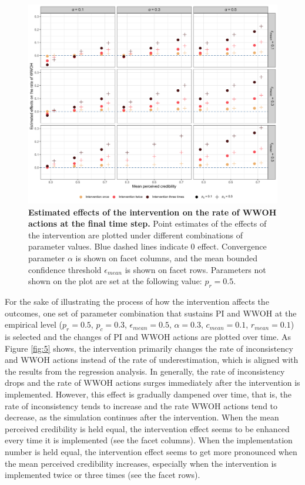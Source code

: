 \documentclass[
  11pt,
]{article}
\begin{document}
\begin{figure}[h]
  \centering
  \includegraphics[width=1\columnwidth]{./figures/intervention_effect_p_wwoh.png}
  \caption{\textbf{Estimated effects of the intervention on the rate of WWOH actions at the final time step.} Point estimates of the effects of the intervention are plotted under different combinations of parameter values. Blue dashed lines indicate 0 effect. Convergence parameter $\alpha$ is shown on facet columns, and the mean bounded confidence threshold $\epsilon_{mean}$ is shown on facet rows. Parameters not shown on the plot are set at the following value: $p_r = 0.5$.}
  \label{fig:4}
\end{figure}

For the sake of illustrating the process of how the intervention affects
the outcomes, one set of parameter combination that sustains PI and WWOH
at the empirical level (\(p_r = 0.5\), \(p_c = 0.3\),
\(\epsilon_{mean} = 0.5\), \(\alpha = 0.3\), \(c_{mean} = 0.1\),
\(r_{mean} = 0.1\)) is selected and the changes of PI and WWOH actions
are plotted over time. As Figure \ref{fig:5} shows, the intervention
primarily changes the rate of inconsistency and WWOH actions instead of
the rate of underestimation, which is aligned with the results from the
regression analysis. In generally, the rate of inconsistency drops and
the rate of WWOH actions surges immediately after the intervention is
implemented. However, this effect is gradually dampened over time, that
is, the rate of inconsistency tends to increase and the rate WWOH
actions tend to decrease, as the simulation continues after the
intervention. When the mean perceived credibility is held equal, the
intervention effect seems to be enhanced every time it is implemented
(see the facet columns). When the implementation number is held equal,
the intervention effect seems to get more pronounced when the mean
perceived credibility increases, especially when the intervention is
implemented twice or three times (see the facet rows).
\end{document}
